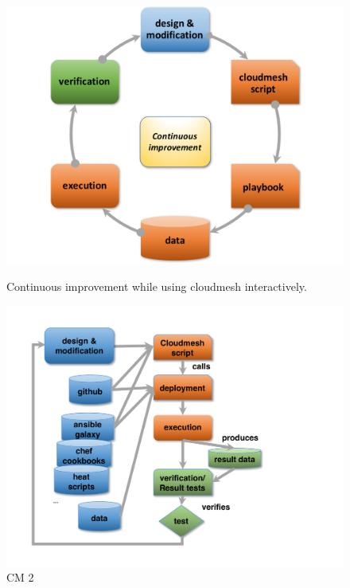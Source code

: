 \begin{figure}[hp]
  \centering
      \includegraphics[width=1.0\columnwidth]{images/nist-devops-1.pdf}
  \caption{Continuous improvement while using cloudmesh interactively.}
  \label{F:NIST-arch}

  \centering
      \includegraphics[width=1.0\columnwidth]{images/nist-devops-2.pdf}
  \caption{CM 2}
  \label{F:NIST-arch}
\end{figure}




